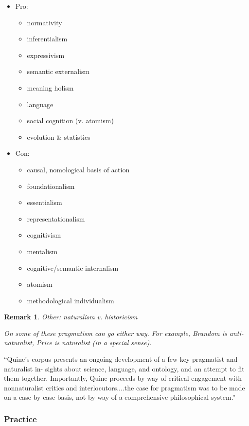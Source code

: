 \documentclass[11pt,twoside]{article}
\newtheorem{remark}{Remark}
\begin{document}
\begin{itemize}
\item Pro:
  \begin{itemize}
  \item normativity
  \item inferentialism
  \item expressivism
  \item semantic externalism
  \item meaning holism
  \item language
  \item social cognition (v. atomism)
  \item evolution \& statistics
  \end{itemize}
\item Con:
  \begin{itemize}
  \item causal, nomological basis of action
  \item foundationalism
  \item essentialism
  \item representationalism
  \item cognitivism
  \item mentalism
  \item cognitive/semantic internalism
  \item atomism
  \item methodological individualism
  \end{itemize}
\end{itemize}

\begin{remark}
  Other:  naturalism v. historicism

On some of these pragmatism can go either way.  For example, Brandom
is anti-naturalist, Price is naturalist (in a special sense).
\end{remark}

``Quine’s corpus presents an ongoing development of a few key
pragmatist and naturalist in- sights about science, language, and
ontology, and an attempt to fit them together. Importantly, Quine
proceeds by way of critical engagement with nonnaturalist critics and
interlocutors....the case for pragmatism was to be made on a
case-by-case basis, not by way of a comprehensive philosophical
system.'' \parencite[8-9]{talisse_pragmatism_2011}

\subsubsection{Practice}
\end{document}
